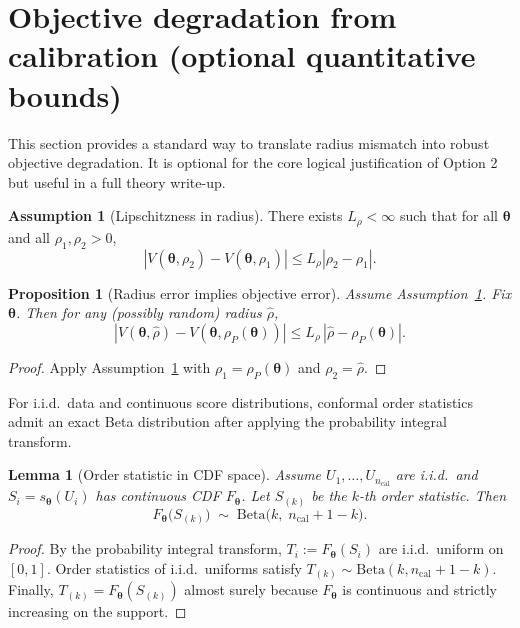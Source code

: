\documentclass[11pt]{article}
\newcommand{\abs}[1]{\left|#1\right|}
\newcommand{\btheta}{\bm{\theta}}
\theoremstyle{plain}
\newtheorem{lemma}[theorem]{Lemma}
\newtheorem{proposition}[theorem]{Proposition}
\theoremstyle{definition}
\newtheorem{assumption}[theorem]{Assumption}
\begin{document}
\section{Objective degradation from calibration (optional quantitative bounds)}

This section provides a standard way to translate radius mismatch into robust objective degradation.
It is optional for the core logical justification of Option 2 but useful in a full theory write-up.

\begin{assumption}[Lipschitzness in radius]\label{asm:lipschitz-rho}
There exists $L_{\rho}<\infty$ such that for all $\btheta$ and all $\rho_1,\rho_2>0$,
\[
\abs{V(\btheta,\rho_2)-V(\btheta,\rho_1)} \le L_{\rho}\abs{\rho_2-\rho_1}.
\]
\end{assumption}

\begin{proposition}[Radius error implies objective error]\label{prop:obj-gap}
Assume Assumption~\ref{asm:lipschitz-rho}.
Fix $\btheta$. Then for any (possibly random) radius $\hat\rho$,
\[
\abs{V(\btheta,\hat\rho)-V(\btheta,\rho_P(\btheta))}
\le
L_{\rho}\,\abs{\hat\rho-\rho_P(\btheta)}.
\]
\end{proposition}

\begin{proof}
Apply Assumption~\ref{asm:lipschitz-rho} with $\rho_1=\rho_P(\btheta)$ and $\rho_2=\hat\rho$.
\end{proof}

For i.i.d.\ data and continuous score distributions, conformal order statistics admit an exact Beta distribution after applying the probability integral transform.

\begin{lemma}[Order statistic in CDF space]\label{lem:beta}
Assume $U_1,\dots,U_{n_{\mathrm{cal}}}$ are i.i.d.\ and $S_i=s_{\btheta}(U_i)$ has continuous CDF $F_{\btheta}$.
Let $S_{(k)}$ be the $k$-th order statistic. Then
\[
F_{\btheta}\big(S_{(k)}\big)\;\sim\;\mathrm{Beta}\big(k,\;n_{\mathrm{cal}}+1-k\big).
\]
\end{lemma}

\begin{proof}
By the probability integral transform, $T_i:=F_{\btheta}(S_i)$ are i.i.d.\ uniform on $[0,1]$.
Order statistics of i.i.d.\ uniforms satisfy $T_{(k)}\sim \mathrm{Beta}(k,n_{\mathrm{cal}}+1-k)$.
Finally, $T_{(k)}=F_{\btheta}(S_{(k)})$ almost surely because $F_{\btheta}$ is continuous and strictly increasing on the support.
\end{proof}
\end{document}
